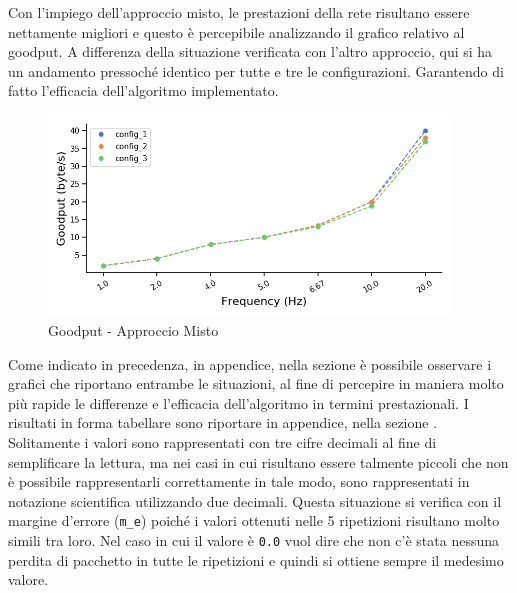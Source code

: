 \noindent Con l'impiego dell'approccio misto, le prestazioni della rete risultano essere nettamente migliori e questo è percepibile analizzando il grafico relativo al goodput. A differenza della situazione verificata con l'altro approccio, qui si ha un andamento pressoché identico per tutte e tre le configurazioni. Garantendo di fatto l'efficacia dell'algoritmo implementato.

\begin{figure}[hbt!]
    \centering
    \includegraphics[width = 0.95\textwidth]{images/graphs/ble_wifi_goodput.png}
    \caption{Goodput - Approccio Misto}
    \label{graph:ble_wifi_goodput}
\end{figure}

\noindent Come indicato in precedenza, in appendice, nella sezione \textit{} è possibile osservare i grafici che riportano entrambe le situazioni, al fine di percepire in maniera molto più rapide le differenze e l'efficacia dell'algoritmo in termini prestazionali. I risultati in forma tabellare sono riportare in appendice, nella sezione . 
Solitamente i valori sono rappresentati con tre cifre decimali al fine di semplificare la lettura, ma nei casi in cui risultano essere talmente piccoli che non è possibile rappresentarli correttamente in tale modo, sono rappresentati in notazione scientifica utilizzando due decimali. Questa situazione si verifica con il margine d'errore (\texttt{m\_e}) poiché i valori ottenuti nelle 5 ripetizioni risultano molto simili tra loro. Nel caso in cui il valore è \texttt{0.0} vuol dire che non c'è stata nessuna perdita di pacchetto in tutte le ripetizioni e quindi si ottiene sempre il medesimo valore.\\

